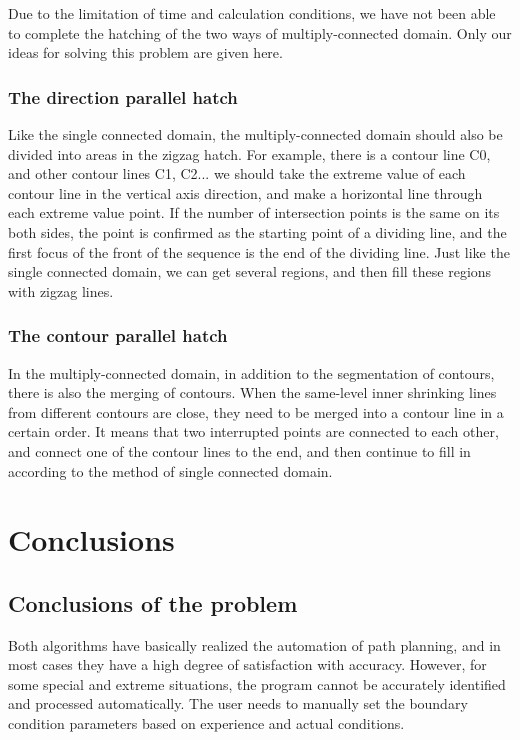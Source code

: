 \documentclass{apmcmthesis}
\begin{document}
Due to the limitation of time and calculation conditions, we have not been able to complete the hatching of the two ways of multiply-connected domain. Only our ideas for solving this problem are given here.

\subsubsection{The direction parallel hatch}

Like the single connected domain, the multiply-connected domain should also be divided into areas in the zigzag hatch. For example, there is a contour line C0, and other contour lines C1, C2... we should take the extreme value of each contour line in the vertical axis direction, and make a horizontal line through each extreme value point. If the number of intersection points is the same on its both sides, the point is confirmed as the starting point of a dividing line, and the first focus of the front of the sequence is the end of the dividing line. Just like the single connected domain, we can get several regions, and then fill these regions with zigzag lines.


\subsubsection{The contour parallel hatch}

In the multiply-connected domain, in addition to the segmentation of contours, there is also the merging of contours. When the same-level inner shrinking lines from different contours are close, they need to be merged into a contour line in a certain order. It means that two interrupted points are connected to each other, and connect one of the contour lines to the end, and then continue to fill in according to the method of single connected domain.

\section{Conclusions}

\subsection{Conclusions of the problem}

Both algorithms have basically realized the automation of path planning, and in most cases they have a high degree of satisfaction with accuracy. However, for some special and extreme situations, the program cannot be accurately identified and processed automatically. The user needs to manually set the boundary condition parameters based on experience and actual conditions.
\end{document}
